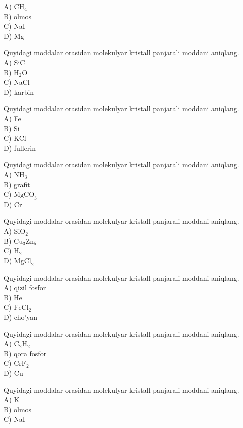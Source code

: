 A) $\mathrm{CH}_{4}$\\
B) olmos\\
C) NaI\\
D) Mg
  \item Quyidagi moddalar orasidan molekulyar kristall panjarali moddani aniqlang.\\
A) SiC\\
B) $\mathrm{H}_{2} \mathrm{O}$\\
C) NaCl\\
D) karbin
  \item Quyidagi moddalar orasidan molekulyar kristall panjarali moddani aniqlang.\\
A) Fe\\
B) Si\\
C) KCl\\
D) fullerin
  \item Quyidagi moddalar orasidan molekulyar kristall panjarali moddani aniqlang.\\
A) $\mathrm{NH}_{3}$\\
B) grafit\\
C) $\mathrm{MgCO}_{3}$\\
D) Cr
  \item Quyidagi moddalar orasidan molekulyar kristall panjarali moddani aniqlang.\\
A) $\mathrm{SiO}_{2}$\\
B) $\mathrm{Cu}_{3} \mathrm{Zn}_{5}$\\
C) $\mathrm{H}_{2}$\\
D) $\mathrm{MgCl}_{2}$
  \item Quyidagi moddalar orasidan molekulyar kristall panjarali moddani aniqlang.\\
A) qizil fosfor\\
B) He\\
C) $\mathrm{FeCl}_{2}$\\
D) cho'yan
  \item Quyidagi moddalar orasidan molekulyar kristall panjarali moddani aniqlang.\\
A) $\mathrm{C}_{2} \mathrm{H}_{2}$\\
B) qora fosfor\\
C) $\mathrm{CrF}_{2}$\\
D) Cu
  \item Quyidagi moddalar orasidan molekulyar kristall panjarali moddani aniqlang.\\
A) K\\
B) olmos\\
C) NaI\\
